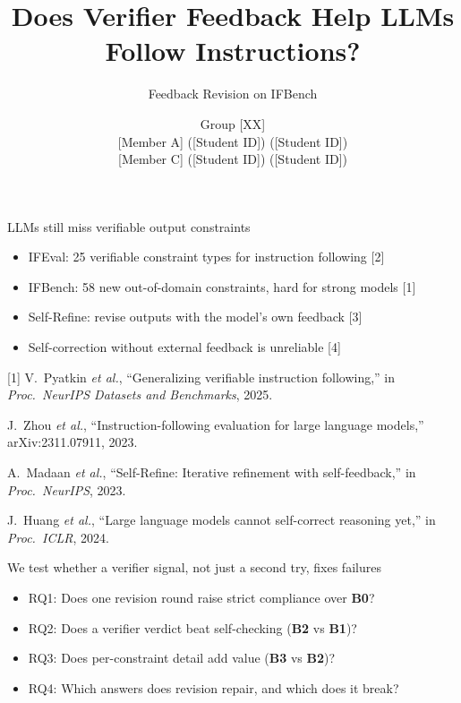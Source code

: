 \documentclass[aspectratio=169,11pt]{beamer}
\title{Does Verifier Feedback Help LLMs Follow Instructions?}
\subtitle{Feedback Revision on IFBench}
\author[Group {[XX]}]{Group [XX]\\[0.4em]
  {\small [Member A] ([Student ID]) \quad [Member B] ([Student ID])}\\
  {\small [Member C] ([Student ID]) \quad [Member D] ([Student ID])}}
\institute{COMP4136 Natural Language Processing\\Hong Kong Baptist University}
\date{}
\newcommand{\Bz}{\textcolor{okBlue}{\textbf{B0}}}
\newcommand{\Bo}{\textcolor{okOrange}{\textbf{B1}}}
\newcommand{\Bt}{\textcolor{okGreen}{\textbf{B2}}}
\newcommand{\Bh}{\textcolor{okPink}{\textbf{B3}}}
\begin{document}
\begin{frame}
  \titlepage
\end{frame}

\begin{frame}{LLMs still miss verifiable output constraints}
  \begin{itemize}
    \item IFEval: 25 verifiable constraint types for instruction following [2]
    \item IFBench: 58 new out-of-domain constraints, hard for strong models [1]
    \item Self-Refine: revise outputs with the model's own feedback [3]
    \item Self-correction without external feedback is unreliable [4]
  \end{itemize}
  \vfill
  {\scriptsize
  [1] V.~Pyatkin \textit{et al.}, ``Generalizing verifiable instruction following,'' in \textit{Proc.\ NeurIPS Datasets and Benchmarks}, 2025.\par
  [2] J.~Zhou \textit{et al.}, ``Instruction-following evaluation for large language models,'' arXiv:2311.07911, 2023.\par
  [3] A.~Madaan \textit{et al.}, ``Self-Refine: Iterative refinement with self-feedback,'' in \textit{Proc.\ NeurIPS}, 2023.\par
  [4] J.~Huang \textit{et al.}, ``Large language models cannot self-correct reasoning yet,'' in \textit{Proc.\ ICLR}, 2024.\par}
\end{frame}

\begin{frame}{We test whether a verifier signal, not just a second try, fixes failures}
  \begin{itemize}
    \item RQ1: Does one revision round raise strict compliance over \Bz?
    \item RQ2: Does a verifier verdict beat self-checking (\Bt{} vs \Bo)?
    \item RQ3: Does per-constraint detail add value (\Bh{} vs \Bt)?
    \item RQ4: Which answers does revision repair, and which does it break?
  \end{itemize}
\end{frame}
\end{document}
